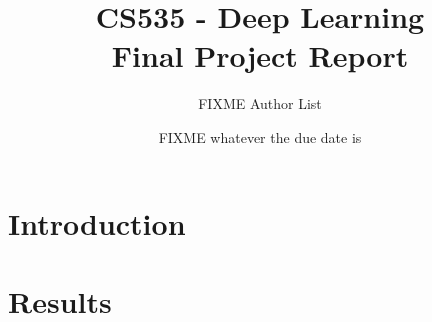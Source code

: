 \documentclass{article}
\author{FIXME Author List}
\title{CS535 - Deep Learning\\Final Project Report}
\date{FIXME whatever the due date is}
\begin{document}
\maketitle

\section{Introduction}


\section{Results}



\end{document}
